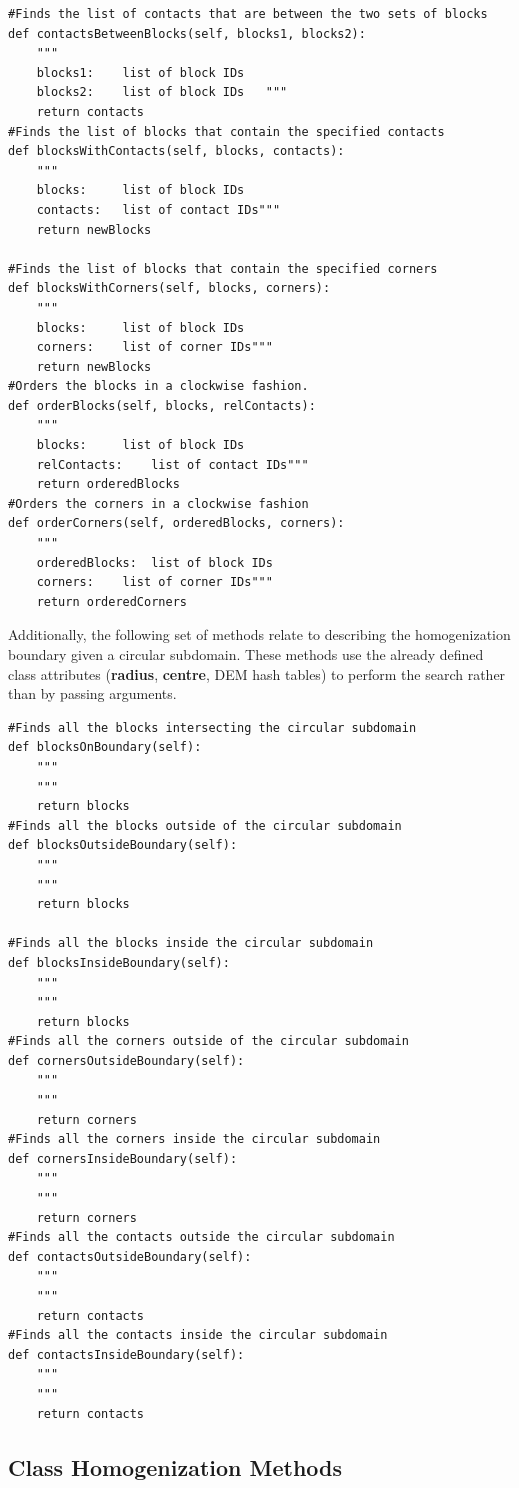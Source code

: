 \begin{lstlisting}[frame=single] 
#Finds the list of contacts that are between the two sets of blocks
def contactsBetweenBlocks(self, blocks1, blocks2):
	"""
	blocks1:	list of block IDs
	blocks2: 	list of block IDs	"""
	return contacts
#Finds the list of blocks that contain the specified contacts
def blocksWithContacts(self, blocks, contacts):
	"""
	blocks:		list of block IDs
	contacts:	list of contact IDs"""
	return newBlocks
	
#Finds the list of blocks that contain the specified corners
def blocksWithCorners(self, blocks, corners):
	"""
	blocks:		list of block IDs
	corners:	list of corner IDs"""
	return newBlocks
#Orders the blocks in a clockwise fashion.
def orderBlocks(self, blocks, relContacts):
	"""
	blocks:		list of block IDs
	relContacts:	list of contact IDs"""
	return orderedBlocks
#Orders the corners in a clockwise fashion
def orderCorners(self, orderedBlocks, corners):
	"""
	orderedBlocks:	list of block IDs
	corners:	list of corner IDs"""
	return orderedCorners
\end{lstlisting}
	
Additionally, the following set of methods relate to describing the homogenization boundary given a circular subdomain. These methods use the already defined class attributes (\textbf{radius}, \textbf{centre}, DEM hash tables) to perform the search rather than by passing arguments.

\begin{lstlisting}[frame=single] 
#Finds all the blocks intersecting the circular subdomain
def blocksOnBoundary(self):
	"""
	"""
	return blocks
#Finds all the blocks outside of the circular subdomain
def blocksOutsideBoundary(self):
	"""
	"""
	return blocks
	
#Finds all the blocks inside the circular subdomain
def blocksInsideBoundary(self):
	"""
	"""
	return blocks
#Finds all the corners outside of the circular subdomain	
def cornersOutsideBoundary(self):
	"""
	"""
	return corners
#Finds all the corners inside the circular subdomain
def cornersInsideBoundary(self):
	"""
	"""
	return corners
#Finds all the contacts outside the circular subdomain
def contactsOutsideBoundary(self):
	"""
	"""
	return contacts
#Finds all the contacts inside the circular subdomain
def contactsInsideBoundary(self):
	"""
	"""
	return contacts
\end{lstlisting}

\subsection{Class Homogenization Methods}

